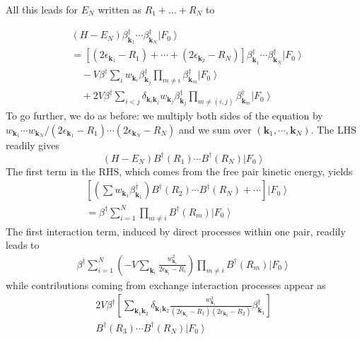 \documentclass[aps,prb,superscriptaddress,showpacs,reprint,lengthcheck]{revtex4}
\newcommand{\vk}{\ensuremath{\mathbf{k}}}
\begin{document}
All this leads for $E_N$ written as $R_1+...+R_N$ to


\begin{equation}\label{eq:HN2}
\begin{split}
&(H-E_N)\beta^{\dagger}_{\mathbf{k} _1}\cdots\beta^{\dagger}_{\mathbf{k}
_N}\left|F_0\right> \\
&=[(2\epsilon_{\vk_1}-R_1)+\cdots+(2\epsilon_{\vk_2}-R_N)]\beta^\dagger_{\vk_1}\cdots\beta^\dagger_{\vk_N}\left|F_0\right>  \\
&\quad-V\beta^\dagger \sum_{i}w_{\vk_i}\beta^\dagger_{\vk_j}\prod_{m\neq{}i}\beta^{\dagger}_{\mathbf{k} _m} \left|F_0\right>  \\
&\quad+2V\beta^\dagger\sum_{i<j}\delta_{\vk_i\vk_j}w_{\vk_j}\beta^\dagger_{\vk_j}\prod_{m\neq(i,j)}\beta^{\dagger}_{\mathbf{k} _m} \left|F_0\right>  
\end{split}
\end{equation}
To go further, we do as before: we multiply both sides of the equation by $w_{\vk_1}\cdots{}w_{\vk_N}/(2\epsilon_{\vk_1}-R_1)\cdots(2\epsilon_{\vk_N}-R_N)$ and we sum over $(\vk_1,\cdots,\vk_N)$.  
The LHS readily gives
\begin{equation}
(H-E _N)B^{\dagger} (R_1)\cdots{}B^{\dagger}(R_N)\left|F_0\right> 
\end{equation}
The first term in the RHS, which comes from the free pair kinetic energy, yields
\begin{equation}
\begin{split}
&[(\sum{}w_{\vk_1}\beta^\dagger_{\vk_1})B^\dagger(R_2)\cdots{}B^\dagger(R_N)+\cdots]\left|F_0\right>\\
&=\beta^\dagger\sum_{i=1}^N\prod_{m\neq{i}}B^\dagger(R_m)\left|F_0\right> 
\end{split}
\end{equation}
The first interaction term, induced by direct processes within one pair, readily leads to 
\begin{equation}
\begin{split}
\beta^\dagger\sum_{i=1}^N(-V\sum_{\vk_i}\frac{w_{\mathbf{k} _i}^2}{2\epsilon_{\mathbf{k} _i}-R_i})\prod_{m\neq{i}}B^\dagger(R_m)\left|F_0\right> 
\end{split}
\end{equation}
while contributions coming from exchange interaction processes appear as
\begin{equation}
\begin{split}
2V\beta^\dagger\left[\sum_{\vk_1\vk_2}\delta_{\vk_1\vk_2}\frac{w^3_{\mathbf{k} _1}}{(2\epsilon_{\mathbf{k} _1}-R_1)(2\epsilon_{\mathbf{k} _2}-R_2)}\beta^\dagger_{\vk_1}\right]\\B^\dagger(R_3)\cdots{}B^\dagger(R_N)\left|F_0\right> 
\end{split}
\end{equation}
\end{document}
